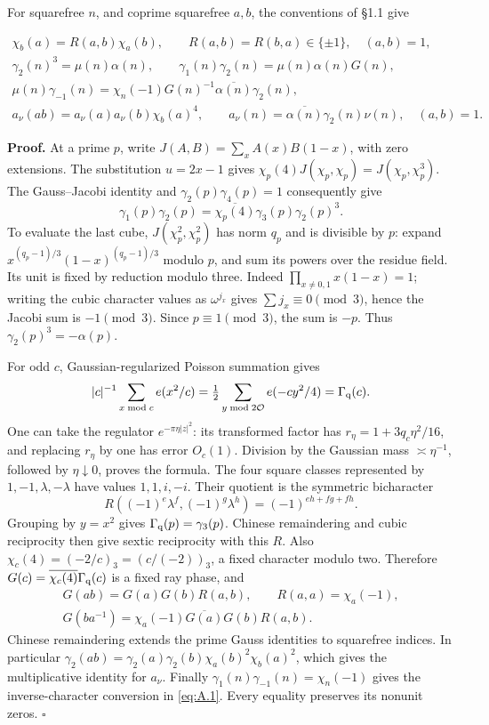 \documentclass[11pt,a4paper]{article}
\begin{document}
For squarefree \(n\), and coprime squarefree \(a,b\), the conventions of §1.1 give

\[
\begin{gathered}
\chi_b(a)=R(a,b)\chi_a(b),\qquad R(a,b)=R(b,a)\in\{\pm1\},\quad (a,b)=1,\\
\gamma_2(n)^3=\mu(n)\alpha(n),\qquad
\gamma_1(n)\gamma_2(n)=\mu(n)\alpha(n)G(n),\\
\mu(n)\gamma_{-1}(n)=\chi_n(-1)G(n)^{-1}\overline{\alpha(n)}\gamma_2(n),\\
a_\nu(ab)=a_\nu(a)a_\nu(b)\chi_b(a)^4,
\qquad a_\nu(n)=\overline{\alpha(n)}\gamma_2(n)\nu(n),\quad (a,b)=1.
\end{gathered}
\tag{A.1}\label{eq:A.1}
\]

\textbf{Proof.} At a prime \(p\), write \(J(A,B)=\sum_xA(x)B(1-x)\), with zero extensions. The substitution \(u=2x-1\) gives \(\chi_p(4)J(\chi_p,\chi_p)=J(\chi_p,\chi_p^3)\). The Gauss--Jacobi identity and \(\gamma_2(p)\gamma_4(p)=1\) consequently give \[
\gamma_1(p)\gamma_2(p)
=\overline{\chi_p(4)}\gamma_3(p)\gamma_2(p)^3.
\] To evaluate the last cube, \(J(\chi_p^2,\chi_p^2)\) has norm \(q_p\) and is divisible by \(p\): expand \(x^{(q_p-1)/3}(1-x)^{(q_p-1)/3}\) modulo \(p\), and sum its powers over the residue field. Its unit is fixed by reduction modulo three. Indeed \(\prod_{x\ne0,1}x(1-x)=1\); writing the cubic character values as \(\omega^{j_x}\) gives \(\sum j_x\equiv0\pmod3\), hence the Jacobi sum is \(-1\pmod3\). Since \(p\equiv1\pmod3\), the sum is \(-p\). Thus \(\gamma_2(p)^3=-\alpha(p)\).

For odd \(c\), Gaussian-regularized Poisson summation gives \[
|c|^{-1}\sum_{x\bmod c}e(x^2/c)
=\tfrac12\sum_{y\bmod2\mathcal O}e(-cy^2/4)=\Gamma_{\rm q}(c).
\] One can take the regulator \(e^{-\pi\eta|z|^2}\): its transformed factor has \(r_\eta=1+3q_c\eta^2/16\), and replacing \(r_\eta\) by one has error \(O_c(1)\). Division by the Gaussian mass \(\asymp\eta^{-1}\), followed by \(\eta\downarrow0\), proves the formula. The four square classes represented by \(1,-1,\lambda,-\lambda\) have values \(1,1,i,-i\). Their quotient is the symmetric bicharacter \[
R((-1)^e\lambda^f,(-1)^g\lambda^h)=(-1)^{eh+fg+fh}.
\] Grouping by \(y=x^2\) gives \(\Gamma_{\rm q}(p)=\gamma_3(p)\). Chinese remaindering and cubic reciprocity then give sextic reciprocity with this \(R\). Also \(\chi_c(4)=(-2/c)_3=(c/(-2))_3\), a fixed character modulo two. Therefore \(G(c)=\overline{\chi_c(4)}\Gamma_{\rm q}(c)\) is a fixed ray phase, and \[
\begin{gathered}
G(ab)=G(a)G(b)R(a,b),\qquad R(a,a)=\chi_a(-1),\\
G(ba^{-1})=\chi_a(-1)\overline{G(a)}G(b)R(a,b).
\end{gathered}
\tag{A.2}\label{eq:A.2}
\] Chinese remaindering extends the prime Gauss identities to squarefree indices. In particular \(\gamma_2(ab)=\gamma_2(a)\gamma_2(b)\chi_a(b)^2\chi_b(a)^2\), which gives the multiplicative identity for \(a_\nu\). Finally \(\gamma_1(n)\gamma_{-1}(n)=\chi_n(-1)\) gives the inverse-character conversion in \eqref{eq:A.1}. Every equality preserves its nonunit zeros. \hfill\(\square\)
\end{document}
